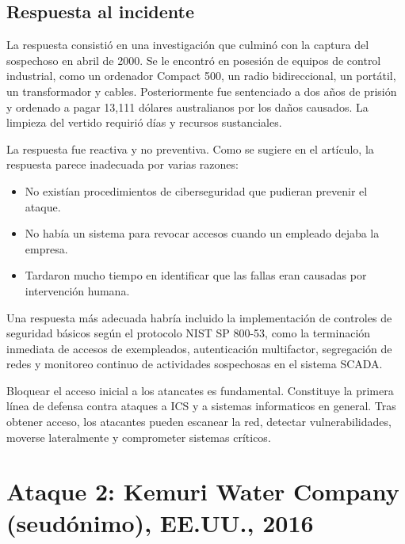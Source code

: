 
\subsection{Respuesta al incidente}
La respuesta consistió en una investigación que culminó con la captura del sospechoso en abril de 2000. Se le encontró en posesión de equipos de control industrial, como un ordenador Compact 500, un radio bidireccional, un portátil, un transformador y cables. Posteriormente fue sentenciado a dos años de prisión y ordenado a pagar 13,111 dólares australianos por los daños causados. La limpieza del vertido requirió días y recursos sustanciales.
\nl

La respuesta fue reactiva y no preventiva. Como se sugiere en el artículo, la respuesta parece inadecuada por varias razones:

\begin{itemize}
    \item No existían procedimientos de ciberseguridad que pudieran prevenir el ataque.
    \item No había un sistema para revocar accesos cuando un empleado dejaba la empresa.
    \item Tardaron mucho tiempo en identificar que las fallas eran causadas por intervención humana.
\end{itemize}

Una respuesta más adecuada habría incluido la implementación de controles de seguridad básicos según el protocolo NIST SP 800-53, como la terminación inmediata de accesos de exempleados, autenticación multifactor, segregación de redes y monitoreo continuo de actividades sospechosas en el sistema SCADA.

Bloquear el acceso inicial a los atancates es fundamental. Constituye la primera línea de defensa contra ataques a ICS y a sistemas informaticos en general. Tras obtener acceso, los atacantes pueden escanear la red, detectar vulnerabilidades, moverse lateralmente y comprometer sistemas críticos.

\section{Ataque 2: Kemuri Water Company (seudónimo), EE.UU., 2016}

